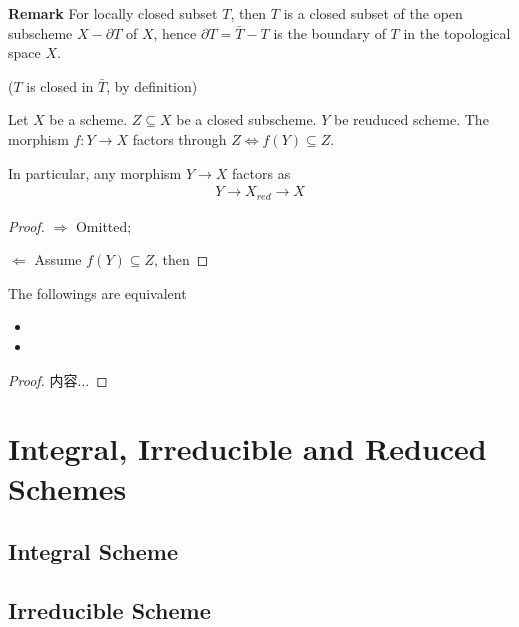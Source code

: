\documentclass[Total.tex]{subfiles}
\begin{document}
			\textbf{Remark} For locally closed subset $T$, then $T$ is a closed subset of the open subscheme $X-\partial T$ of $X$, hence $\partial T=\bar{T}-T$ is the boundary of $T$ in the topological space $X$.
			
			($T$ is closed in $\bar{T}$, by definition)
			
			\begin{lemma}
				Let $X$ be a scheme. $Z\subseteq X$ be a closed subscheme. $Y$ be reuduced scheme. The morphism $f:Y\rightarrow X$ factors through $Z\Leftrightarrow f(Y)\subseteq Z$. 
				
				In particular, any morphism $Y\rightarrow X$ factors as
				\begin{gather*}
					Y\rightarrow X_{red}\rightarrow X
				\end{gather*}
			\end{lemma}
			\begin{proof}
				$\Rightarrow$ Omitted;
				
				$\Leftarrow$ Assume $f(Y)\subseteq Z$, then 
			\end{proof}
			
			\begin{lemma}
				The followings are equivalent
				\begin{itemize}
					\item 
					\item 
				\end{itemize}
			\end{lemma}
			\begin{proof}
				内容...
			\end{proof}
		\section{Integral, Irreducible and Reduced Schemes}
			\subsection{Integral Scheme}
			\subsection{Irreducible Scheme}
		
\end{document}

